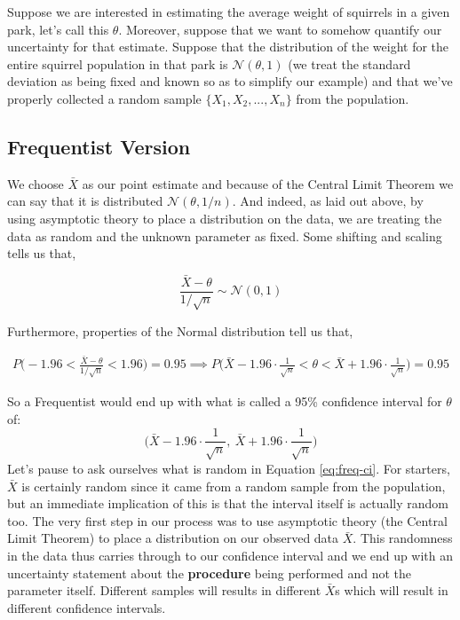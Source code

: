 \documentclass[12pt,twoside]{reedthesis}
\begin{document}
Suppose we are interested in estimating the average weight of squirrels in a given park, let's call this \(\theta\). Moreover, suppose that we want to somehow quantify our uncertainty for that estimate. Suppose that the distribution of the weight for the entire squirrel population in that park is \(\mathcal{N}(\theta, 1)\) (we treat the standard deviation as being fixed and known so as to simplify our example) and that we've properly collected a random sample \(\{X_1, X_2, ..., X_n\}\) from the population.

\hypertarget{frequentist-version}{%
\subsection{Frequentist Version}\label{frequentist-version}}

We choose \(\bar{X}\) as our point estimate and because of the Central Limit Theorem we can say that it is distributed \(\mathcal{N}(\theta, 1/n)\). And indeed, as laid out above, by using asymptotic theory to place a distribution on the data, we are treating the data as random and the unknown parameter as fixed. Some shifting and scaling tells us that,

\[
\frac{\bar{X} - \theta}{1/\sqrt{n}} \sim \mathcal{N}(0,1)
\]

Furthermore, properties of the Normal distribution tell us that,

\[
\begin{aligned}
P\bigg(-1.96 < \frac{\bar{X} - \theta}{1/\sqrt{n}} < 1.96\bigg) = 0.95 \implies P\bigg(\bar{X} - 1.96\cdot\frac{1}{\sqrt{n}} < \theta < \bar{X} + 1.96\cdot\frac{1}{\sqrt{n}}\bigg) = 0.95
\end{aligned}
\]

So a Frequentist would end up with what is called a 95\% confidence interval for \(\theta\) of:
\begin{equation}
  \bigg(\bar{X} - 1.96\cdot\frac{1}{\sqrt{n}}, \ \bar{X} + 1.96\cdot\frac{1}{\sqrt{n}}\bigg)
  \label{eq:freq-ci}
\end{equation}
Let's pause to ask ourselves what is random in Equation \eqref{eq:freq-ci}. For starters, \(\bar{X}\) is certainly random since it came from a random sample from the population, but an immediate implication of this is that the interval itself is actually random too. The very first step in our process was to use asymptotic theory (the Central Limit Theorem) to place a distribution on our observed data \(\bar{X}\). This randomness in the data thus carries through to our confidence interval and we end up with an uncertainty statement about the \textbf{procedure} being performed and not the parameter itself. Different samples will results in different \(\bar{X}\)s which will result in different confidence intervals.
\end{document}

